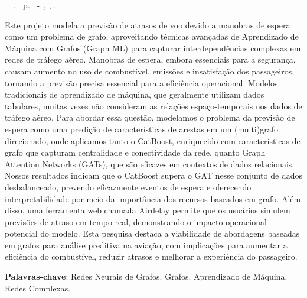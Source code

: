 \setlength{\absparsep}{18pt} %
\begin{resumo}
	\begin{flushleft} 
			\setlength{\absparsep}{0pt} %
			\SingleSpacing 
			\imprimirautorabr~~\textbf{\imprimirtituloresumo}.	\imprimirdata. \pageref{LastPage}p. 
			\imprimirtipotrabalho~-~\imprimirinstituicao, \imprimirlocal, \imprimirdata. 
 	\end{flushleft}
\OnehalfSpacing 	

Este projeto modela a previsão de atrasos de voo devido a manobras de espera como um problema de grafo, aproveitando técnicas avançadas de Aprendizado de Máquina com Grafos (Graph ML) para capturar interdependências complexas em redes de tráfego aéreo. Manobras de espera, embora essenciais para a segurança, causam aumento no uso de combustível, emissões e insatisfação dos passageiros, tornando a previsão precisa essencial para a eficiência operacional. Modelos tradicionais de aprendizado de máquina, que geralmente utilizam dados tabulares, muitas vezes não consideram as relações espaço-temporais nos dados de tráfego aéreo. Para abordar essa questão, modelamos o problema da previsão de espera como uma predição de características de arestas em um (multi)grafo direcionado, onde aplicamos tanto o CatBoost, enriquecido com características de grafo que capturam centralidade e conectividade da rede, quanto Graph Attention Networks (GATs), que são eficazes em contextos de dados relacionais. Nossos resultados indicam que o CatBoost supera o GAT nesse conjunto de dados desbalanceado, prevendo eficazmente eventos de espera e oferecendo interpretabilidade por meio da importância dos recursos baseados em grafo. Além disso, uma ferramenta web chamada Airdelay permite que os usuários simulem previsões de atraso em tempo real, demonstrando o impacto operacional potencial do modelo. Esta pesquisa destaca a viabilidade de abordagens baseadas em grafos para análise preditiva na aviação, com implicações para aumentar a eficiência do combustível, reduzir atrasos e melhorar a experiência do passageiro.

\vspace{\onelineskip}

\noindent \textbf{Palavras-chave}: Redes Neurais de Grafos. Grafos. Aprendizado de Máquina. Redes Complexas.


\end{resumo}
